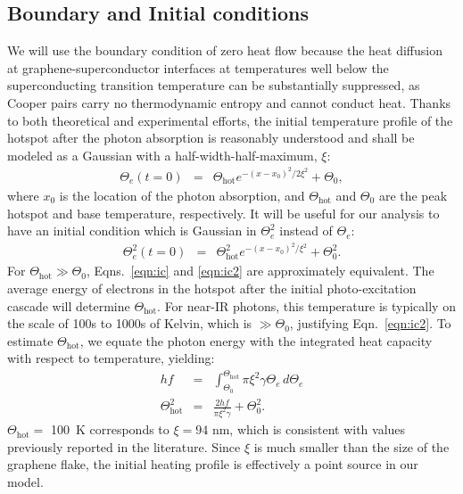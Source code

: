 \documentclass[aip, amsmath,amssymb, reprint]{revtex4-1}
\newcommand{\ba}{\begin{eqnarray}}
\newcommand{\ea}{\end{eqnarray}}
\begin{document}
\subsection{Boundary and Initial conditions}\label{sec:bic}
We will use the boundary condition of zero heat flow because the heat diffusion at graphene-superconductor interfaces at temperatures well below the superconducting transition temperature can be substantially suppressed, as Cooper pairs carry no thermodynamic entropy and cannot conduct heat\cite{Satterthwaite.1962,Fong.2013}. Thanks to both theoretical \cite{Song.2013ykg} and experimental \cite{Brida.2013,Johannsen.2013,Ulstrup,Ruzicka.2010,Gallagher.2019,Block.2021} efforts, the initial temperature profile of the hotspot after the photon absorption is reasonably understood and shall be modeled as a Gaussian with a half-width-half-maximum, $\xi$:
\ba \Theta_e(t=0) &=& \Theta_{\text{hot}} e^{-(x-x_0)^2/2\xi^2} + \Theta_0,\label{eqn:ic}\ea
where $x_0$ is the location of the photon absorption, and $\Theta_{\text{hot}}$ and $\Theta_0$ are the peak hotspot and base temperature, respectively. It will be useful for our analysis to have an initial condition which is Gaussian in $\Theta_e^2$ instead of $\Theta_e$:
\ba \Theta_e^2(t=0) &=& \Theta_{\text{hot}}^2 e^{-(x-x_0)^2/\xi^2}+\Theta_0^2. \label{eqn:ic2} \ea
For $\Theta_{\text{hot}} \gg \Theta_0$, Eqns.\ \ref{eqn:ic} and \ref{eqn:ic2} are approximately equivalent. The average energy of electrons in the hotspot after the initial photo-excitation cascade\cite{Song.201102t,Tielrooij.2013} will determine $\Theta_{\text{hot}}$. For near-IR photons, this temperature is typically on the scale of 100s to 1000s of Kelvin, which is $\gg\Theta_0$, justifying Eqn.\ \ref{eqn:ic2}. To estimate $\Theta_{\text{hot}}$, we equate the photon energy with the integrated heat capacity with respect to temperature, yielding\cite{Walsh.2017}: 
\ba hf &=& \int_{\Theta_0}^{\Theta_{\text{hot}}} \pi\xi^2\gamma\Theta_e \, d\Theta_e \label{eqn:hotspot1} \\
 \Theta_{\text{hot}}^2 &=& \frac{2hf}{\pi\xi^2\gamma} + \Theta_0^2 \label{eqn:hotspot2}.\ea
$\Theta_{\text{hot}}=$ 100~K corresponds to $\xi = 94$ nm, which is consistent with values previously reported in the literature\cite{Song.2013,Block.2021}. Since $\xi$ is much smaller than the size of the graphene flake, the initial heating profile is effectively a point source in our model.
\end{document}
